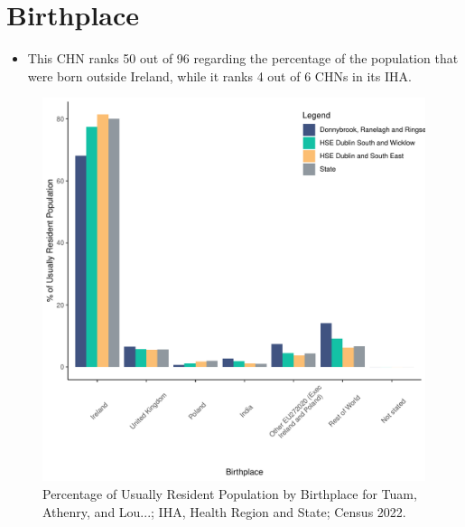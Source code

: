 \documentclass{article}
\begin{document}
\section{Birthplace}\label{sect:Birth}
\begin{itemize}
\item This CHN ranks  50 out of 96 regarding the percentage of the population that were born outside Ireland, while it ranks  4 out of 6 CHNs in its IHA.
\end{itemize}
\begin{figure}[H]
	\centering
	\includegraphics[width = 130mm]{../figures/BirthED.pdf}
	\caption{Percentage of Usually Resident Population by Birthplace for Tuam, Athenry, and Lou...; IHA, Health Region and State; Census 2022.}
	\label{fig:vbnv}
	\end{figure}
	
\end{document}
